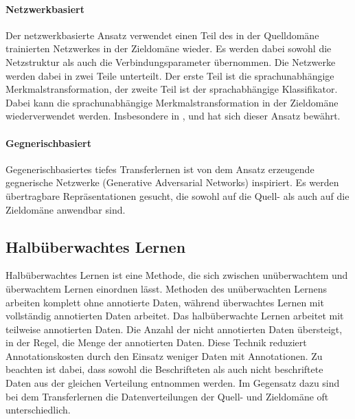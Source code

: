 		\paragraph{Netzwerkbasiert} Der netzwerkbasierte Ansatz verwendet einen Teil des in der Quelldomäne trainierten Netzwerkes in der Zieldomäne wieder. Es werden dabei sowohl die Netzstruktur als auch die Verbindungsparameter übernommen. Die Netzwerke werden dabei in zwei Teile unterteilt. Der erste Teil ist die sprachunabhängige Merkmalstransformation, der zweite Teil ist der sprachabhängige Klassifikator. Dabei kann die sprachunabhängige Merkmalstransformation in der Zieldomäne wiederverwendet werden. Insbesondere in \cite{JasonYosinski.2014}, \cite{Long.2016} und \cite{George.2018} hat sich dieser Ansatz bewährt.
		
		\paragraph{Gegnerischbasiert} Gegenerischbasiertes tiefes Transferlernen ist von dem Ansatz erzeugende gegnerische Netzwerke (Generative Adversarial Networks) \cite{IanJ.Goodfellow.2014} inspiriert. Es werden übertragbare Repräsentationen gesucht, die sowohl auf die Quell- als auch auf die Zieldomäne anwendbar sind.

		\subsection{Halbüberwachtes Lernen}
		Halbüberwachtes Lernen ist eine Methode, die sich zwischen unüberwachtem und überwachtem Lernen einordnen lässt. Methoden des unüberwachten Lernens arbeiten komplett ohne annotierte Daten, während überwachtes Lernen mit vollständig annotierten Daten arbeitet. Das halbüberwachte Lernen arbeitet mit teilweise annotierten Daten. Die Anzahl der nicht annotierten Daten übersteigt, in der Regel, die Menge der annotierten Daten. Diese Technik reduziert Annotationskosten durch den Einsatz weniger Daten mit Annotationen. Zu beachten ist dabei, dass sowohl die Beschrifteten als auch nicht beschriftete Daten aus der gleichen Verteilung entnommen werden. 
		Im Gegensatz dazu sind bei dem Transferlernen die Datenverteilungen der Quell- und Zieldomäne oft unterschiedlich.
		\cite{Chapelle.2010} 
				
